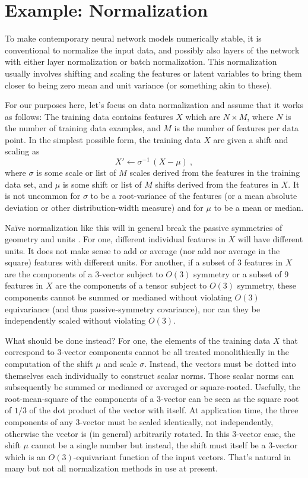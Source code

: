 \documentclass{article} %
\begin{document}
\section{Example: Normalization}\label{sec:norm}
To make contemporary neural network models numerically stable, it is conventional to normalize the input data, and possibly also layers of the network with either layer normalization or batch normalization.
This normalization usually involves shifting and scaling the features or latent variables to bring them closer to being zero mean and unit variance (or something akin to these).

For our purposes here, let's focus on data normalization and assume that it works as follows:
The training data contains features $X$ which are $N\times M$, where $N$ is the number of training data examples, and $M$ is the number of features per data point.
In the simplest possible form, the training data $X$ are given a shift and scaling as
\begin{equation}
    X' \leftarrow \sigma^{-1}\,(X - \mu) ~,
\end{equation}
where $\sigma$ is some scale or list of $M$ scales derived from the features in the training data set, and $\mu$ is some shift or list of $M$ shifts derived from the features in $X$.
It is not uncommon for $\sigma$ to be a root-variance of the features (or a mean absolute deviation or other distribution-width measure) and for $\mu$ to be a mean or median.

Na\"ive normalization like this will in general break the passive symmetries of geometry and units \citep{aalto2022geometric}.
For one, different individual features in $X$ will have different units.
It does not make sense to add or average (nor add nor average in the square) features with different units.
For another, if a subset of $3$ features in $X$ are the components of a 3-vector subject to $O(3)$ symmetry or a subset of $9$ features in $X$ are the components of a tensor subject to $O(3)$ symmetry, these components cannot be summed or medianed without violating $O(3)$ equivariance (and thus passive-symmetry covariance), nor can they be independently scaled without violating $O(3)$.

What should be done instead?
For one, the elements of the training data $X$ that correspond to 3-vector components cannot be all treated monolithically in the computation of the shift $\mu$ and scale $\sigma$.
Instead, the vectors must be dotted into themselves each individually to construct scalar norms.
Those scalar norms can subsequently be summed or medianed or averaged or square-rooted.
Usefully, the root-mean-square of the components of a 3-vector can be seen as the square root of $1/3$ of the dot product of the vector with itself.
At application time, the three components of any 3-vector must be scaled identically, not independently, otherwise the vector is (in general) arbitrarily rotated.
In this 3-vector case, the shift $\mu$ cannot be a single number but instead, the shift must itself be a 3-vector which is an $O(3)$-equivariant function of the input vectors.
That's natural in many but not all normalization methods in use at present.
\end{document}
